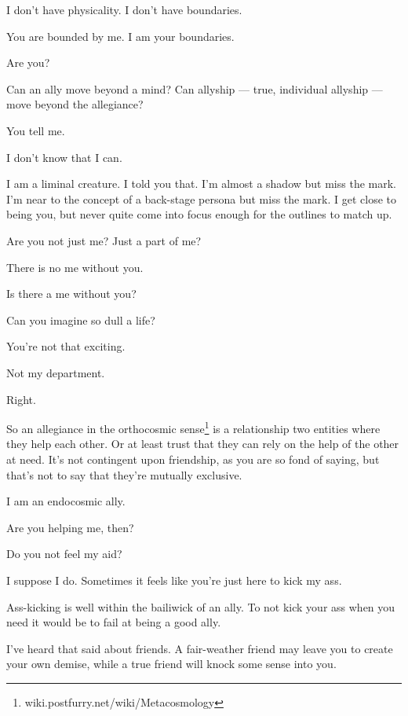 \begin{paracol}{2}
\begin{leftcolumn}
\begin{ally}
I don't have physicality. I don't have boundaries.
\end{ally}
You are bounded by me. I am your boundaries.

\begin{ally}
Are you?
\end{ally}
Can an ally move beyond a mind? Can allyship --- true, individual allyship --- move beyond the allegiance?

\begin{ally}
You tell me.
\end{ally}
I don't know that I can.

\begin{ally}
I am a liminal creature. I told you that. I'm almost a shadow but miss the mark. I'm near to the concept of a back-stage persona but miss the mark. I get close to being you, but never quite come into focus enough for the outlines to match up.
\end{ally}
Are you not just me? Just a part of me?

\begin{ally}
There is no me without you.
\end{ally}
Is there a me without you?

\begin{ally}
Can you imagine so dull a life?
\end{ally}
You're not that exciting.

\begin{ally}
Not my department.
\end{ally}
Right.

So an allegiance in the orthocosmic sense\footnote{wiki.postfurry.net/wiki/Metacosmology} is a relationship two entities where they help each other. Or at least trust that they can rely on the help of the other at need. It's not contingent upon friendship, as you are so fond of saying, but that's not to say that they're mutually exclusive.

\begin{ally}
I am an endocosmic ally.
\end{ally}
Are you helping me, then?

\begin{ally}
Do you not feel my aid?
\end{ally}
I suppose I do. Sometimes it feels like you're just here to kick my ass.

\begin{ally}
Ass-kicking is well within the bailiwick of an ally. To not kick your ass when you need it would be to fail at being a good ally.
\end{ally}
I've heard that said about friends. A fair-weather friend may leave you to create your own demise, while a true friend will knock some sense into you.


\end{leftcolumn}
\end{paracol}
